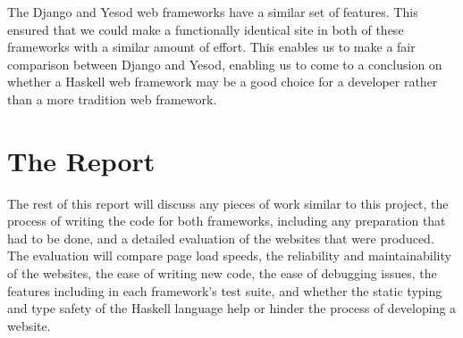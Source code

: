 The Django and Yesod web frameworks have a similar set of features. This ensured that we could
make a functionally identical site in both of these frameworks with a similar 
amount of effort. This enables us to make a fair comparison between Django and Yesod, enabling
us to come to a conclusion on whether a Haskell web framework may be a good choice for a 
developer rather than a more tradition web framework.

\section{The Report}

The rest of this report will discuss any pieces of work similar to this project, the process of
writing the code for both frameworks, including any preparation that had to be done, and a detailed
evaluation of the websites that were produced. The evaluation will compare page load speeds,
the reliability and maintainability of the websites, the ease of writing new code, the ease of
debugging issues, the features including in each framework's test suite, and whether the static typing
and type safety of the Haskell language help or hinder the process of developing a website.